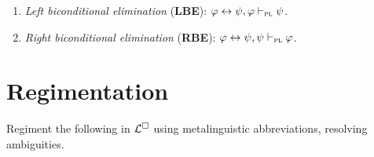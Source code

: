 \documentclass[a4paper, 11pt]{article}                  %
\begin{document}
\begin{enumerate}
	\item \textit{Left biconditional elimination} (\textbf{LBE}): $\varphi \leftrightarrow \psi, \varphi \vdash_{\textsc{pl}} \psi$.

	\item \textit{Right biconditional elimination} (\textbf{RBE}): $\varphi \leftrightarrow \psi, \psi \vdash_{\textsc{pl}} \varphi$.

\end{enumerate}





\section{Regimentation}

Regiment the following in $\mathcal{L}^{\square}$ using metalinguistic abbreviations, resolving ambiguities.
\end{document}
